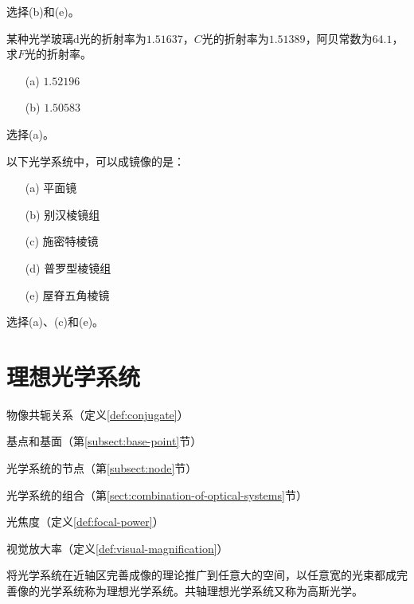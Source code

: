 \documentclass[cn,11pt]{elegantbook}
\begin{document}
\begin{solution}
	选择(b)和(e)。
\end{solution}

\begin{problem}
	某种光学玻璃d光的折射率为$1.51637$，$C$光的折射率为$1.51389$，阿贝常数为$64.1$，求$F$光的折射率。
	\begin{itemize}
		\item [(a)] $1.52196$
		\item [(b)] $1.50583$
	\end{itemize}
\end{problem}

\begin{solution}
	选择(a)。
\end{solution}

\begin{problem}
	以下光学系统中，可以成镜像的是：
	\begin{itemize}
		\item [(a)] 平面镜
		\item [(b)] 别汉棱镜组
		\item [(c)] 施密特棱镜
		\item [(d)] 普罗型棱镜组
		\item [(e)] 屋脊五角棱镜
	\end{itemize}
\end{problem}

\begin{solution}
	选择(a)、(c)和(e)。
\end{solution}

\chapter{理想光学系统}

\begin{introduction}
	\item 物像共轭关系（定义\ref{def:conjugate}）
	\item 基点和基面（第\ref{subsect:base-point}节）
	\item 光学系统的节点（第\ref{subsect:node}节）
	\item 光学系统的组合（第\ref{sect:combination-of-optical-systems}节）
	\item 光焦度（定义\ref{def:focal-power}）
	\item 视觉放大率（定义\ref{def:visual-magnification}）
\end{introduction}

将光学系统在近轴区完善成像的理论推广到任意大的空间，以任意宽的光束都成完善像的光学系统称为理想光学系统。共轴理想光学系统又称为高斯光学。
\end{document}

